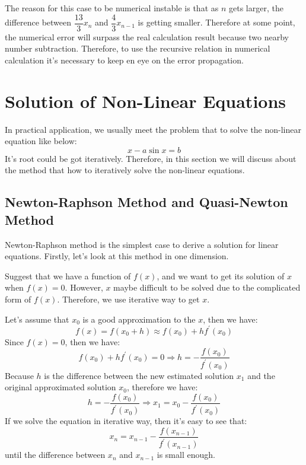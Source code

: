 The reason for this case to be numerical instable is that as $n$ gets larger,
the difference between $\dfrac{13}{3}x_{n}$ and $\dfrac{4}{3}x_{n-1}$ is getting 
smaller. Therefore at some point, the numerical error will surpass the 
real calculation result because two nearby number subtraction. Therefore, to use
the recursive relation in numerical calculation it's necessary to keep en eye
on the error propagation. 

\section{Solution of Non-Linear Equations}

In practical application, we usually meet the problem that to solve the non-linear
equation like below:
\begin{equation}
 x - a\sin x = b
\end{equation}
It's root could be got iteratively. Therefore, in this section we will discuss about
the method that how to iteratively solve the non-linear equations.

\subsection{Newton-Raphson Method and Quasi-Newton Method}
%
%
%
Newton-Raphson method is the simplest case to derive a solution for linear equations. 
Firstly, let's look at this method in one dimension.

Suggest that we have a function of $f(x)$, and we want to get its solution of $x$
when $f(x) = 0$. However, $x$ maybe difficult to be solved due to the complicated form
of $f(x)$. Therefore, we use iterative way to get $x$.

Let's assume that $x_{0}$ is a good approximation to the $x$, then we have:
\begin{equation}\label{Newton-Raphson_eq:1}
 f(x) = f(x_{0} + h) \approx f(x_{0}) + hf^{'}(x_{0})
\end{equation}
Since $f(x) = 0$, then we have:
\begin{equation}
 \label{Newton-Raphson_eq:2}
 f(x_{0}) + hf^{'}(x_{0}) = 0 \Rightarrow h = -\frac{f(x_{0})}{f^{'}(x_{0})}
\end{equation}
Because $h$ is the difference between the new estimated solution $x_{1}$ and
the original approximated solution $x_{0}$, therefore we have:
\begin{equation}
 \label{Newton-Raphson_eq:3}
 h = -\frac{f(x_{0})}{f^{'}(x_{0})} \Rightarrow x_{1} = x_{0} - \frac{f(x_{0})}{f^{'}(x_{0})}
\end{equation}
If we solve the equation in iterative way, then it's easy to see that:
\begin{equation}
 \label{Newton-Raphson_eq:4}
 x_{n} = x_{n-1} - \frac{f(x_{n-1})}{f^{'}(x_{n-1})}
\end{equation}
until the difference between $x_{n}$ and $x_{n-1}$ is small enough. 

